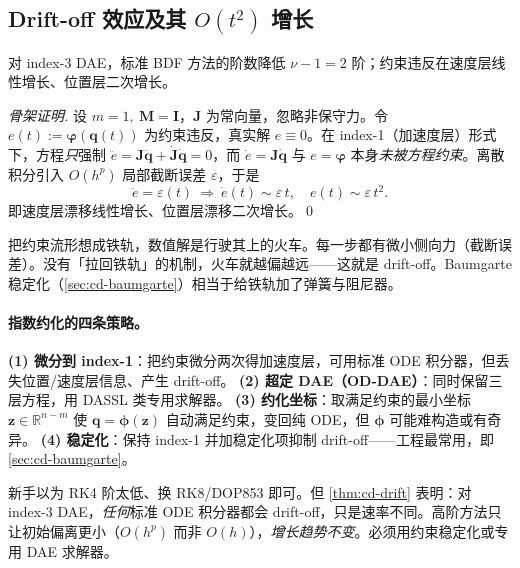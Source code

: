 \subsection{Drift-off 效应及其 \texorpdfstring{$O(t^2)$}{O(t2)} 增长}
\begin{theorem}\label{thm:cd-drift}
对 index-3 DAE，标准 BDF 方法的阶数降低 $\nu-1=2$ 阶；约束违反在速度层线性增长、位置层二次增长。
\end{theorem}
\begin{proof}[骨架证明]
设 $m=1,\ \mathbf M=\mathbf I$，$\mathbf J$ 为常向量，忽略非保守力。令 $e(t):=\boldsymbol\varphi(\mathbf q(t))$ 为约束违反，真实解 $e\equiv0$。在 index-1（加速度层）形式下，方程\emph{只}强制 $\ddot e=\mathbf J\ddot{\mathbf q}+\dot{\mathbf J}\dot{\mathbf q}=0$，而 $\dot e=\mathbf J\dot{\mathbf q}$ 与 $e=\boldsymbol\varphi$ 本身\emph{未被方程约束}。离散积分引入 $O(h^p)$ 局部截断误差 $\varepsilon$，于是
\begin{equation}
  \ddot e=\varepsilon(t)\ \Longrightarrow\ \dot e(t)\sim\varepsilon\,t,\quad e(t)\sim\varepsilon\,t^2.
  \label{eq:cd-driftoff}
\end{equation}
即速度层漂移线性增长、位置层漂移二次增长。\qed
\end{proof}

\begin{insight}[火车与铁轨]
把约束流形想成铁轨，数值解是行驶其上的火车。每一步都有微小侧向力（截断误差）。没有「拉回铁轨」的机制，火车就越偏越远——这就是 drift-off。Baumgarte 稳定化（\cref{sec:cd-baumgarte}）相当于给铁轨加了弹簧与阻尼器。
\end{insight}

\paragraph{指数约化的四条策略。}
\textbf{(1) 微分到 index-1}：把约束微分两次得加速度层，可用标准 ODE 积分器，但丢失位置/速度层信息、产生 drift-off。\;
\textbf{(2) 超定 DAE（OD-DAE）}：同时保留三层方程，用 DASSL 类专用求解器。\;
\textbf{(3) 约化坐标}：取满足约束的最小坐标 $\mathbf z\in\mathbb R^{n-m}$ 使 $\mathbf q=\boldsymbol\phi(\mathbf z)$ 自动满足约束，变回纯 ODE，但 $\boldsymbol\phi$ 可能难构造或有奇异。\;
\textbf{(4) 稳定化}：保持 index-1 并加稳定化项抑制 drift-off——工程最常用，即 \cref{sec:cd-baumgarte}。

\begin{pitfall}
新手以为 RK4 阶太低、换 RK8/DOP853 即可。但 \cref{thm:cd-drift} 表明：对 index-3 DAE，\emph{任何}标准 ODE 积分器都会 drift-off，只是速率不同。高阶方法只让初始偏离更小（$O(h^p)$ 而非 $O(h)$），\emph{增长趋势不变}。必须用约束稳定化或专用 DAE 求解器。
\end{pitfall}

